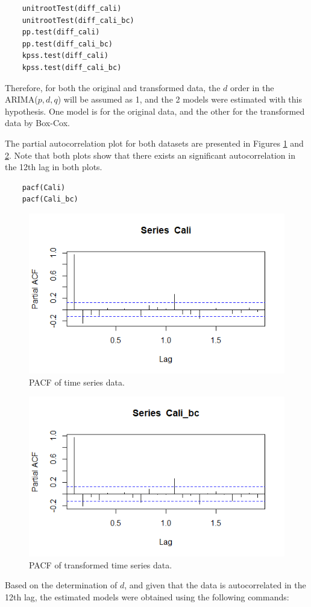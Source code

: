 \documentclass[fleqn]{article}
\begin{document}
\begin{enumerate}
\begin{verbatim}
    unitrootTest(diff_cali) 
    unitrootTest(diff_cali_bc) 
    pp.test(diff_cali) 
    pp.test(diff_cali_bc) 
    kpss.test(diff_cali) 
    kpss.test(diff_cali_bc) 
    \end{verbatim}
    Therefore, for both the original and transformed data, the $d$ order in the ARIMA($p,d,q$) will be assumed as 1, and the 2 models were estimated with this hypothesis. One model is for the original data, and the other for the transformed data by Box-Cox.
    
    The partial autocorrelation plot for both datasets are presented in Figures \ref{fig:PACFCut} and \ref{fig:PACFCox}. Note that both plots show that there exists an significant autocorrelation in the 12th lag in both plots.
    \begin{verbatim}
    pacf(Cali)
    pacf(Cali_bc)
    \end{verbatim}
    \begin{figure}[H]
        \centering
        \includegraphics[width=0.6\linewidth]{figs/PACFCut.png}
        \caption{PACF of time series data.}
        \label{fig:PACFCut}
    \end{figure}
    \begin{figure}[H]
        \centering
        \includegraphics[width=0.6\linewidth]{figs/PACFCox.png}
        \caption{PACF of transformed time series data.}
        \label{fig:PACFCox}
    \end{figure}
    Based on the determination of $d$, and given that the data is autocorrelated in the 12th lag, the estimated models were obtained using the following commands:

\end{enumerate}
\end{document}
